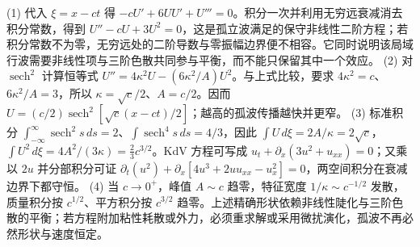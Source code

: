 (1) 代入 \(\xi=x-ct\) 得 \(-cU'+6UU'+U'''=0\)。积分一次并利用无穷远衰减消去积分常数，得到 \(U''-cU+3U^2=0\)，这是孤立波满足的保守非线性二阶方程；若积分常数不为零，无穷远处的二阶导数与零振幅边界便不相容。它同时说明该局域行波需要非线性项与三阶色散共同参与平衡，而不能只保留其中一个效应。
(2) 对 \(\operatorname{sech}^2\) 计算恒等式 \(U''=4\kappa^2U-(6\kappa^2/A)U^2\)。与上式比较，要求 \(4\kappa^2=c\)、\(6\kappa^2/A=3\)，所以 \(\kappa=\sqrt c/2\)、\(A=c/2\)。因而 \(U=(c/2)\operatorname{sech}^2[\sqrt c(x-ct)/2]\)；越高的孤波传播越快并更窄。
(3) 标准积分 \(\int_{-\infty}^\infty\operatorname{sech}^2s\,ds=2\)、\(\int\operatorname{sech}^4s\,ds=4/3\)，因此 \(\int U\,d\xi=2A/\kappa=2\sqrt c\)，\(\int U^2\,d\xi=4A^2/(3\kappa)=\frac23c^{3/2}\)。KdV 方程可写成 \(u_t+\partial_x(3u^2+u_{xx})=0\)；又乘以 \(2u\) 并分部积分可证 \(\partial_t(u^2)+\partial_x[4u^3+2uu_{xx}-u_x^2]=0\)，两空间积分在衰减边界下都守恒。
(4) 当 \(c\to0^+\)，峰值 \(A\sim c\) 趋零，特征宽度 \(1/\kappa\sim c^{-1/2}\) 发散，质量积分按 \(c^{1/2}\)、平方积分按 \(c^{3/2}\) 趋零。上述精确形状依赖非线性陡化与三阶色散的平衡；若方程附加粘性耗散或外力，必须重求解或采用微扰演化，孤波不再必然形状与速度恒定。
